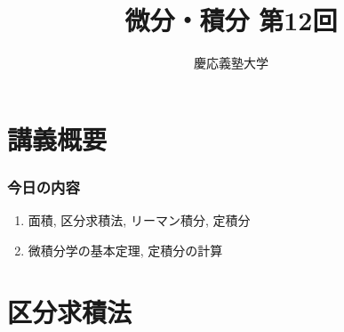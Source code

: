 \documentclass[dvipdfmx,cjk,10.2pt]{beamer}
\theoremstyle{definition}
\begin{document}
\title{微分・積分 第12回} 
\author{慶応義塾大学}            %
\date{}



\begin{frame}                  %
\titlepage                     %
\end{frame}








\section{講義概要}


\begin{frame}
\frametitle{今日の内容}



\begin{enumerate}
\item 面積, 区分求積法, リーマン積分, 定積分
\item 微積分学の基本定理, 定積分の計算
\end{enumerate} 



\end{frame}








\section{区分求積法}
\end{document}
